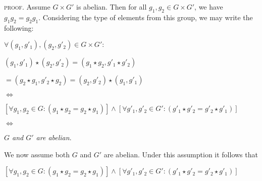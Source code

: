 \documentclass[12pt, a4paper]{article}
\begin{document}
\vspace{4mm}

    \textsc{proof. }Assume $G\times G'$ is abelian. Then for all $g_1,g_2\in G\times G'$, we have $g_1g_2=g_2g_1$. Considering the type of elements from this group, we may write the following:\par
    
\vspace{6mm}

        \centerline{$\forall (g_1,g'_1),(g_2,g'_2)\in G\times G'\colon$}\par
        
\vspace{2mm}

        \centerline{$(g_1,g'_1)\star(g_2,g'_2)=(g_1\star g_2,g'_1\star g'_2)$}\par
        
\vspace{2mm}

        \centerline{$=(g_2\star g_1,g'_2\star g_2)=(g_2,g'_2)\star(g_1,g'_1)$}\par
        
\vspace{2mm}

        \centerline{$\Leftrightarrow$}\par
        
\vspace{2mm}

        \centerline{$[\forall g_1,g_2\in G\colon(g_1\star g_2=g_2\star g_1)]\wedge[\forall g'_1,g'_2\in G'\colon (g'_1\star g'_2=g'_2\star g'_1)]$}\par
        
\vspace{2mm}

        \centerline{$\Leftrightarrow$}\par
        
\vspace{2mm}

        \centerline{\textit{$G$ and $G'$ are abelian}.}
        
\vspace{6mm}

    We now assume both $G$ and $G'$ are abelian. Under this assumption it follows that\par
    
\vspace{6mm}

        \centerline{$[\forall g_1,g_2\in G\colon(g_1\star g_2=g_2\star g_1)]\wedge[\forall g'_1,g'_2\in G'\colon (g'_1\star g'_2=g'_2\star g'_1)]$}\par
        
\end{document}
